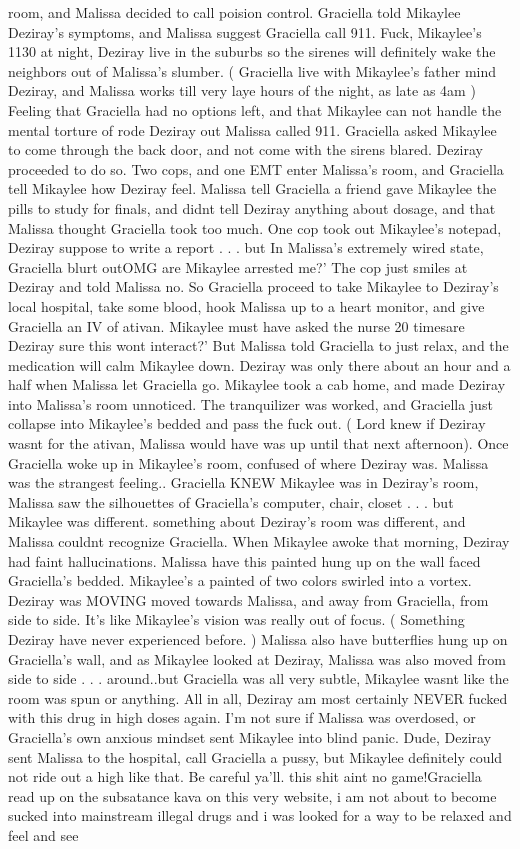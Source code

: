 \documentclass[12pt]{book}
\begin{document}
room, and Malissa decided to call poision control. Graciella told Mikaylee Deziray's symptoms, and Malissa suggest Graciella call 911. Fuck, Mikaylee's 1130 at night, Deziray live in the suburbs so the sirenes will definitely wake the neighbors out of Malissa's slumber. ( Graciella live with Mikaylee's father mind Deziray, and Malissa works till very laye hours of the night, as late as 4am ) Feeling that Graciella had no options left, and that Mikaylee can not handle the mental torture of rode Deziray out Malissa called 911. Graciella asked Mikaylee to come through the back door, and not come with the sirens blared. Deziray proceeded to do so. Two cops, and one EMT enter Malissa's room, and Graciella tell Mikaylee how Deziray feel. Malissa tell Graciella a friend gave Mikaylee the pills to study for finals, and didnt tell Deziray anything about dosage, and that Malissa thought Graciella took too much. One cop took out Mikaylee's notepad, Deziray suppose to write a report . . .  but In Malissa's extremely wired state, Graciella blurt outOMG are Mikaylee arrested me?' The cop just smiles at Deziray and told Malissa no. So Graciella proceed to take Mikaylee to Deziray's local hospital, take some blood, hook Malissa up to a heart monitor, and give Graciella an IV of ativan. Mikaylee must have asked the nurse 20 timesare Deziray sure this wont interact?' But Malissa told Graciella to just relax, and the medication will calm Mikaylee down. Deziray was only there about an hour and a half when Malissa let Graciella go. Mikaylee took a cab home, and made Deziray into Malissa's room unnoticed. The tranquilizer was worked, and Graciella just collapse into Mikaylee's bedded and pass the fuck out. ( Lord knew if Deziray wasnt for the ativan, Malissa would have was up until that next afternoon). Once Graciella woke up in Mikaylee's room, confused of where Deziray was. Malissa was the strangest feeling.. Graciella KNEW Mikaylee was in Deziray's room, Malissa saw the silhouettes of Graciella's computer, chair, closet . . .  but Mikaylee was different. something about Deziray's room was different, and Malissa couldnt recognize Graciella. When Mikaylee awoke that morning, Deziray had faint hallucinations. Malissa have this painted hung up on the wall faced Graciella's bedded. Mikaylee's a painted of two colors swirled into a vortex. Deziray was MOVING moved towards Malissa, and away from Graciella, from side to side. It's like Mikaylee's vision was really out of focus. ( Something Deziray have never experienced before. ) Malissa also have butterflies hung up on Graciella's wall, and as Mikaylee looked at Deziray, Malissa was also moved from side to side . . .  around..but Graciella was all very subtle, Mikaylee wasnt like the room was spun or anything. All in all, Deziray am most certainly NEVER fucked with this drug in high doses again. I'm not sure if Malissa was overdosed, or Graciella's own anxious mindset sent Mikaylee into blind panic. Dude, Deziray sent Malissa to the hospital, call Graciella a pussy, but Mikaylee definitely could not ride out a high like that. Be careful ya'll. this shit aint no game!Graciella read up on the subsatance kava on this very website, i am not about to become sucked into mainstream illegal drugs and i was looked for a way to be relaxed and feel and see 
\end{document}
